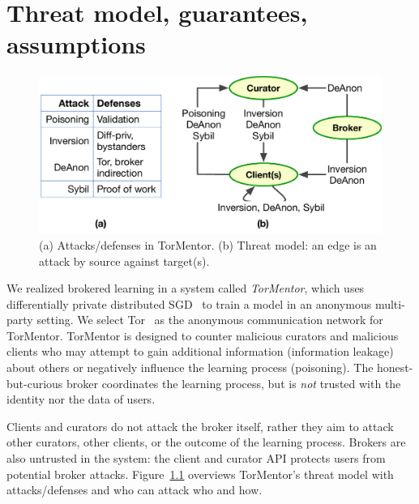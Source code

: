 \chapter{Threat model, guarantees, assumptions}
\label{sec:threat}

\begin{figure}[t]
  \centering
  \includegraphics[width=.9\linewidth]{fig/who-attacks-who}
  \caption{(a) Attacks/defenses in TorMentor. (b) Threat model: an
    edge is an attack by source against target(s).}
  \label{fig:threatmodel}
\end{figure}


We realized brokered learning in a system called \emph{TorMentor},
which uses differentially private distributed SGD~\cite{Song:2013} to
train a model in an anonymous multi-party setting. We select 
Tor~\cite{Dingledine:2004} as the anonymous communication network for
TorMentor. TorMentor is designed to counter malicious curators and
malicious clients who may attempt to gain additional information 
(information leakage) about others or negatively influence the
learning process (poisoning). The honest-but-curious broker coordinates
the learning process, but is \emph{not} trusted with the identity nor
the data of users.

Clients and curators do not attack the broker itself, rather they aim
to attack other curators, other clients, or the outcome of the learning
process. Brokers are also untrusted in the system: the client and
curator \ac{API} protects users from potential broker attacks. 
Figure~\ref{fig:threatmodel} overviews TorMentor's threat model with
attacks/defenses and who can attack who and how. \\

